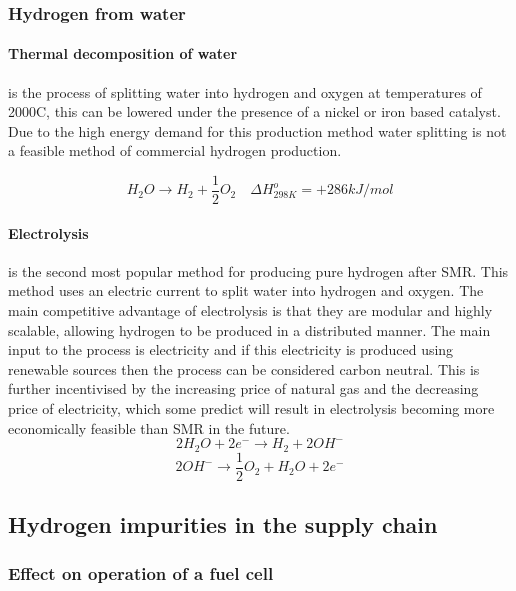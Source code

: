 \subsubsection{Hydrogen from water}
\paragraph{Thermal decomposition of water}
is the process of splitting water into hydrogen and oxygen at temperatures of 2000\textdegree C, this can be lowered under the presence of a nickel or iron based catalyst. Due to the high energy demand for this production method water splitting is not a feasible method of commercial hydrogen production.

\begin{equation}
    H_2 O \rightarrow H_2 + \frac{1}{2} O_2  \quad \Delta H_{298K}^o = +286 kJ/mol
\end{equation}

\paragraph{Electrolysis}
is the second most popular method for producing pure hydrogen after SMR. This method uses an electric current to split water into hydrogen and oxygen. The main competitive advantage of electrolysis is that they are modular and highly scalable, allowing hydrogen to be produced in a distributed manner. The main input to the process is electricity and if this electricity is produced using renewable sources then the process can be considered carbon neutral. This is further incentivised by the increasing price of natural gas and the decreasing price of electricity, which some predict will result in electrolysis becoming more economically feasible than SMR in the future. 
\begin{equation}
2H_2 O +  2e^- \rightarrow H_2 + 2OH^-
\end{equation}
\begin{equation}
2OH^- \rightarrow \frac{1}{2}O_2+ H_2 O + 2e^-
\end{equation}


\subsection{Hydrogen impurities in the supply chain}

\subsubsection{Effect on operation of a fuel cell}


